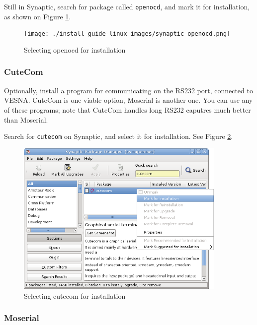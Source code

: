 \documentclass[a4paper, 10pt]{article}
\begin{document}
Still in Synaptic, search for package called \verb+openocd+,
and mark it for installation, as shown on Figure \ref{fig:synaptic-openocd}.


    \begin{figure}[H]
    \centering
        \texttt{[image: ./install-guide-linux-images/synaptic-openocd.png]}
        \caption{Selecting openocd for installation}
        \label{fig:synaptic-openocd}
    \end{figure}


\subsubsection{CuteCom}

Optionally, install a program for communicating on the RS232 port,
connected to VESNA.
CuteCom is one viable option, Moserial is another one.
You can use any of these programs; note that CuteCom handles long
RS232 caputres much better than Moserial.

Search for \verb+cutecom+ on Synaptic, and select it for installation.
See Figure \ref{fig:synaptic-cutecom}.

    \begin{figure}[H]
    \centering
        \includegraphics[width=0.9\textwidth]{./install-guide-linux-images/synaptic-cutecom.png}
        \caption{Selecting cutecom for installation}
        \label{fig:synaptic-cutecom}
    \end{figure}

\subsubsection{Moserial}
\end{document}
